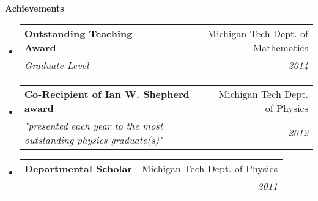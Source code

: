 \documentclass[letterpaper,11pt]{article}
\makeatletter
\newcommand{\resheading}[1]{{\large \textbf{#1}}}
\newcommand{\ressubheading}[4]{
\begin{tabular*}{6.5in}{l@{\extracolsep{\fill}}r}
		\textbf{#1} & #2 \\
		\textit{#3} & \textit{#4} \\
\end{tabular*}\vspace{-6pt}}
\makeatother
\begin{document}
\resheading{Achievements}
\begin{itemize}
\item
\ressubheading{Outstanding Teaching Award}{Michigan Tech Dept. of Mathematics}{Graduate Level}{2014}
\item
\ressubheading{Co-Recipient of Ian W. Shepherd award}{Michigan Tech Dept. of Physics}{"presented each year to the most outstanding physics graduate(s)"}{2012}
\item
\ressubheading{Departmental Scholar}{Michigan Tech Dept. of Physics}{}{2011}

\end{itemize}
\end{document}
